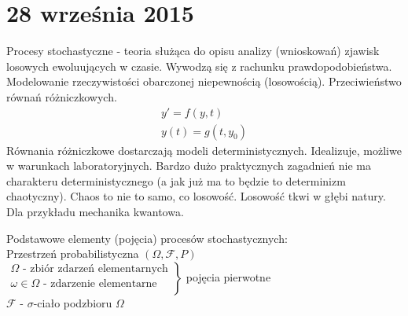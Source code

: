 \chapter{28 września 2015}
Procesy stochastyczne - teoria służąca do opisu analizy (wnioskowań) zjawisk losowych ewoluujących w czasie. Wywodzą się z rachunku prawdopodobieństwa. Modelowanie rzeczywistości obarczonej niepewnością (losowością). Przeciwieństwo równań różniczkowych.
\begin{gather*}
y'=f(y,t)\\
y(t)=g(t,y_0)
\end{gather*}
Równania różniczkowe dostarczają modeli deterministycznych. Idealizuje, możliwe w warunkach laboratoryjnych. Bardzo dużo praktycznych zagadnień nie ma charakteru deterministycznego (a jak już ma to będzie to determinizm chaotyczny). Chaos to nie to samo, co losowość. Losowość tkwi w głębi natury. Dla przykładu mechanika kwantowa.

Podstawowe elementy (pojęcia) procesów stochastycznych:\\
Przestrzeń probabilistyczna $(\Omega,\mathcal F,P)$\\
$ \left .
\begin{array}{l}
 \Omega \text{ - zbiór zdarzeń elementarnych}\\
 \omega\in\Omega \text{ - zdarzenie elementarne}\\
\end{array}
\right \} $ pojęcia pierwotne\\
$ \mathcal F $ - $ \sigma $-ciało podzbioru $ \Omega $

